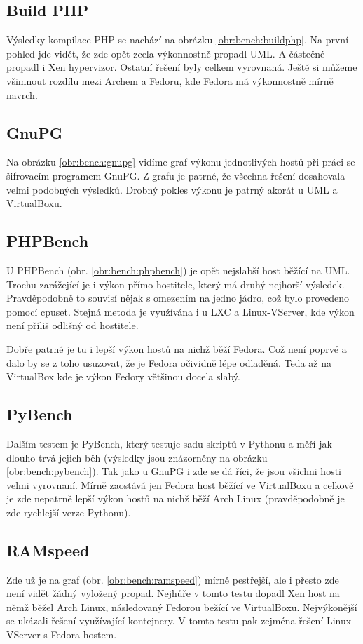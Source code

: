 \subsection{Build PHP}
Výsledky kompilace PHP se nachází na obrázku \ref{obr:bench:buildphp}. Na první pohled jde vidět, že zde opět zcela výkonnostně propadl UML. A částečné propadl i Xen hypervizor. Ostatní řešení byly celkem vyrovnaná. Ještě si můžeme všimnout rozdílu mezi Archem a Fedoru, kde Fedora má výkonnostně mírně navrch.

\subsection{GnuPG}
Na obrázku \ref{obr:bench:gnupg} vidíme graf výkonu jednotlivých hostů při práci se šifrovacím programem GnuPG. Z grafu je patrné, že všechna řešení dosahovala velmi podobných výsledků. Drobný pokles výkonu je patrný akorát u UML a VirtualBoxu.


\subsection{PHPBench}
U PHPBench (obr. \ref{obr:bench:phpbench}) je opět nejslabší host běžící na UML. Trochu zarážející je i výkon přímo hostitele, který má druhý nejhorší výsledek. Pravděpodobně to souvisí nějak s omezením na jedno jádro, což bylo provedeno pomocí cpuset. Stejná metoda je využívána i u LXC a Linux-VServer, kde výkon není příliš odlišný od hostitele.

Dobře patrné je tu i lepší výkon hostů na nichž běží Fedora. Což není poprvé a dalo by se z toho usuzovat, že je Fedora očividně lépe odladěná. Teda až na VirtualBox kde je výkon Fedory většinou docela slabý. 

\subsection{PyBench}
Dalším testem je PyBench, který testuje sadu skriptů v Pythonu a měří jak dlouho trvá jejich běh (výsledky jsou znázorněny na obrázku \ref{obr:bench:pybench}). Tak jako u GnuPG i zde se dá říci, že jsou všichni hosti velmi vyrovnaní. Mírně zaostává jen Fedora host běžící ve VirtualBoxu a celkově je zde nepatrně lepší výkon hostů na nichž běží Arch Linux (pravděpodobně je zde rychlejší verze Pythonu).
\subsection{RAMspeed}
Zde už je na graf (obr. \ref{obr:bench:ramspeed}) mírně pestřejší, ale i přesto zde není vidět žádný vyložený propad. Nejhůře v tomto testu dopadl Xen host na němž běžel Arch Linux, následovaný Fedorou bežící ve VirtualBoxu. Nejvýkonější se ukázali řešení využívající kontejnery. V tomto testu pak zejména řešení Linux-VServer s Fedora hostem.
